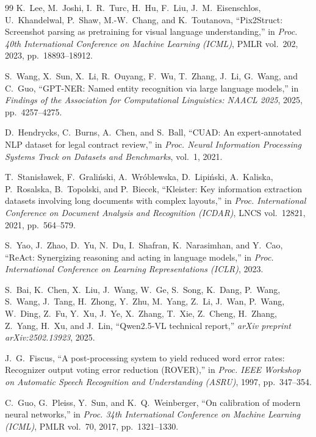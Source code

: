 \documentclass[conference]{IEEEtran}
\begin{document}
\begin{thebibliography}{99}
K.~Lee, M.~Joshi, I.~R.~Turc, H.~Hu, F.~Liu, J.~M.~Eisenschlos,
U.~Khandelwal, P.~Shaw, M.-W.~Chang, and K.~Toutanova,
``Pix2Struct: Screenshot parsing as pretraining for visual language
understanding,''
in \textit{Proc. 40th International Conference on Machine Learning
(ICML)}, PMLR vol.~202, 2023, pp.~18893--18912.

S.~Wang, X.~Sun, X.~Li, R.~Ouyang, F.~Wu, T.~Zhang,
J.~Li, G.~Wang, and C.~Guo,
``GPT-NER: Named entity recognition via large language models,''
in \textit{Findings of the Association for Computational Linguistics:
NAACL 2025}, 2025, pp.~4257--4275.

D.~Hendrycks, C.~Burns, A.~Chen, and S.~Ball,
``CUAD: An expert-annotated NLP dataset for legal contract review,''
in \textit{Proc. Neural Information Processing Systems Track on
Datasets and Benchmarks}, vol.~1, 2021.

T.~Stanis{\l}awek, F.~Grali{\'n}ski, A.~Wr{\'o}blewska, D.~Lipi{\'n}ski,
A.~Kaliska, P.~Rosalska, B.~Topolski, and P.~Biecek,
``Kleister: Key information extraction datasets involving long documents
with complex layouts,''
in \textit{Proc. International Conference on Document Analysis and
Recognition (ICDAR)}, LNCS vol.~12821, 2021, pp.~564--579.

S.~Yao, J.~Zhao, D.~Yu, N.~Du, I.~Shafran, K.~Narasimhan,
and Y.~Cao,
``ReAct: Synergizing reasoning and acting in language models,''
in \textit{Proc. International Conference on Learning
Representations (ICLR)}, 2023.

S.~Bai, K.~Chen, X.~Liu, J.~Wang, W.~Ge, S.~Song, K.~Dang, P.~Wang, S.~Wang, J.~Tang, H.~Zhong, Y.~Zhu, M.~Yang, Z.~Li, J.~Wan, P.~Wang, W.~Ding, Z.~Fu, Y.~Xu, J.~Ye, X.~Zhang, T.~Xie, Z.~Cheng, H.~Zhang, Z.~Yang, H.~Xu, and J.~Lin,
``Qwen2.5-VL technical report,''
\textit{arXiv preprint arXiv:2502.13923}, 2025.

J.~G.~Fiscus,
``A post-processing system to yield reduced word error rates:
Recognizer output voting error reduction (ROVER),''
in \textit{Proc. IEEE Workshop on Automatic Speech Recognition and
Understanding (ASRU)}, 1997, pp.~347--354.

C.~Guo, G.~Pleiss, Y.~Sun, and K.~Q.~Weinberger,
``On calibration of modern neural networks,''
in \textit{Proc. 34th International Conference on Machine Learning
(ICML)}, PMLR vol.~70, 2017, pp.~1321--1330.


\end{thebibliography}
\end{document}
